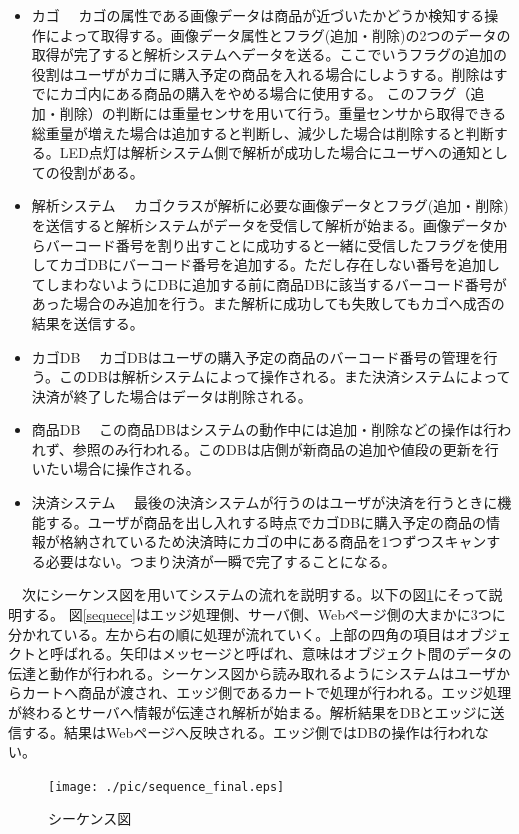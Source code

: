\begin{itemize}
\item カゴ
　カゴの属性である画像データは商品が近づいたかどうか検知する操作によって取得する。画像データ属性とフラグ(追加・削除)の2つのデータの取得が完了すると解析システムへデータを送る。ここでいうフラグの追加の役割はユーザがカゴに購入予定の商品を入れる場合にしようする。削除はすでにカゴ内にある商品の購入をやめる場合に使用する。
このフラグ（追加・削除）の判断には重量センサを用いて行う。重量センサから取得できる総重量が増えた場合は追加すると判断し、減少した場合は削除すると判断する。LED点灯は解析システム側で解析が成功した場合にユーザへの通知としての役割がある。
\item 解析システム
　カゴクラスが解析に必要な画像データとフラグ(追加・削除)を送信すると解析システムがデータを受信して解析が始まる。画像データからバーコード番号を割り出すことに成功すると一緒に受信したフラグを使用してカゴDBにバーコード番号を追加する。ただし存在しない番号を追加してしまわないようにDBに追加する前に商品DBに該当するバーコード番号があった場合のみ追加を行う。また解析に成功しても失敗してもカゴへ成否の結果を送信する。
\item カゴDB
　カゴDBはユーザの購入予定の商品のバーコード番号の管理を行う。このDBは解析システムによって操作される。また決済システムによって決済が終了した場合はデータは削除される。
\item 商品DB
　この商品DBはシステムの動作中には追加・削除などの操作は行われず、参照のみ行われる。このDBは店側が新商品の追加や値段の更新を行いたい場合に操作される。
\item 決済システム
　最後の決済システムが行うのはユーザが決済を行うときに機能する。ユーザが商品を出し入れする時点でカゴDBに購入予定の商品の情報が格納されているため決済時にカゴの中にある商品を1つずつスキャンする必要はない。つまり決済が一瞬で完了することになる。
\end{itemize}

　次にシーケンス図を用いてシステムの流れを説明する。以下の図\ref{sequence}にそって説明する。
図\ref{sequece}はエッジ処理側、サーバ側、Webページ側の大まかに3つに分かれている。左から右の順に処理が流れていく。上部の四角の項目はオブジェクトと呼ばれる。矢印はメッセージと呼ばれ、意味はオブジェクト間のデータの伝達と動作が行われる。シーケンス図から読み取れるようにシステムはユーザからカートへ商品が渡され、エッジ側であるカートで処理が行われる。エッジ処理が終わるとサーバへ情報が伝達され解析が始まる。解析結果をDBとエッジに送信する。結果はWebページへ反映される。エッジ側ではDBの操作は行われない。


\begin{figure}[htbp]
\centering
\texttt{[image: ./pic/sequence\_final.eps]}
\caption{シーケンス図}
\label{sequence}
\end{figure}



